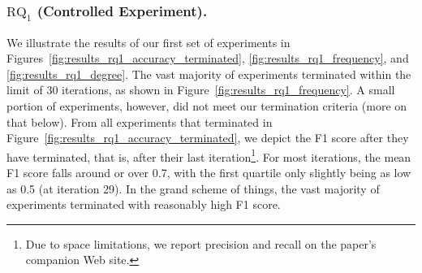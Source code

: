 \documentclass[sigconf, screen]{acmart}
\begin{document}
	\subsubsection{$\text{RQ}_1$ (Controlled Experiment).}
	We illustrate the results of our first set of experiments in Figures~\ref{fig:results_rq1_accuracy_terminated}, \ref{fig:results_rq1_frequency}, and \ref{fig:results_rq1_degree}. The vast majority of experiments terminated within the limit of 30 iterations, as shown in Figure~\ref{fig:results_rq1_frequency}. A small portion of experiments, however, did not meet our termination criteria (more on that below). From all experiments that terminated in Figure~\ref{fig:results_rq1_accuracy_terminated}, we depict the F1 score after they have terminated, that is, after their last iteration\footnote{Due to space limitations, we report precision and recall on the paper's companion Web site.}. For most iterations, the mean F1 score falls around or over 0.7, with the first quartile  only slightly being as low as 0.5 (at iteration 29).  In the grand scheme of things, the vast majority of experiments terminated with reasonably high F1 score. 
\end{document}
